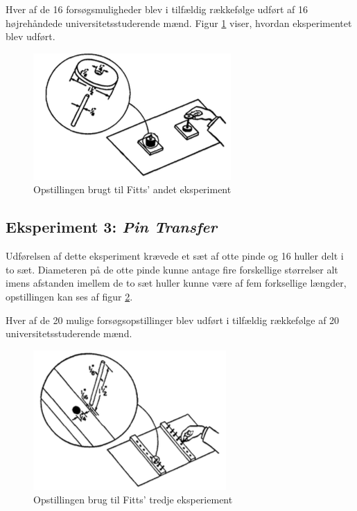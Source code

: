 Hver af de 16 forsøgsmuligheder blev i tilfældig rækkefølge udført af 16 højrehåndede universitetsstuderende mænd. Figur \ref{fig:FittsEx2} viser, hvordan eksperimentet blev udført.
\begin{figure}[h]
\centering
\includegraphics[scale=0.9]{images/illustrations/fitt_ex2}
\caption{Opstillingen brugt til Fitts' andet eksperiment \cite{fitts1954}}
\label{fig:FittsEx2}
\end{figure}

\subsection*{Eksperiment 3: \textit{Pin Transfer}}
Udførelsen af dette eksperiment krævede et sæt af otte pinde og 16 huller delt i to sæt. Diameteren på de otte pinde kunne antage fire forskellige størrelser alt imens afstanden imellem de to sæt huller kunne være af fem forksellige længder, opstillingen kan ses af figur \ref{fig:FittsEx3}.

Hver af de 20 mulige forsøgsopstillinger blev udført i tilfældig rækkefølge af 20 universitetsstuderende mænd.
\begin{figure}[h]
\centering
\includegraphics[scale=0.9]{images/illustrations/fitt_ex3}
\caption{Opstillingen brug til Fitts' tredje eksperiement \cite{fitts1954}}
\label{fig:FittsEx3}
\end{figure}


